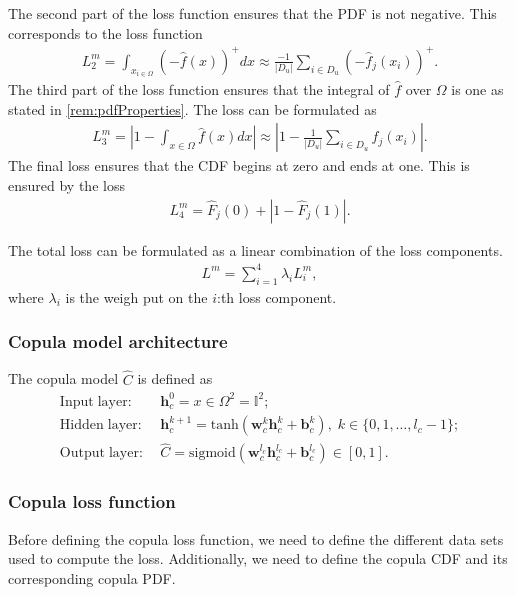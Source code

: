 The second part of the loss function ensures that the \gls{PDF} is not negative. This corresponds to the loss function 
\begin{align*}
    L_2^m = \int_{x_{i\in\Omega}} (-\hat{f}(x))^+dx \approx \frac{-1}{|D_{u}|} \sum_{i \in D_{u}} (-\hat{f}_j(x_i))^+.
\end{align*}
The third part of the loss function ensures that the integral of $\hat{f}$ over $\Omega$ is one as stated in \cref{rem:pdfProperties}. The loss can be formulated as 
\begin{align*}
    L_3^m = \left | 1- \int_{x\in \Omega} \hat{f}(x) dx    \right | \approx \left | 1- \frac{1}{|D_{u}|} \sum_{i \in D_{u}} \hat{f}_j(x_i)  \right |.
\end{align*}
The final loss ensures that the \gls{CDF} begins at zero and ends at one. This is ensured by the loss
\begin{align*}
    L_4^m = \hat{F}_j(0) + |1- \hat{F}_j(1) |.
\end{align*}

The total loss can be formulated as a linear combination of the loss components. 
\begin{align*}
    L^m = \sum_{i=1}^4 \lambda_i L_i^m,
\end{align*}
where $\lambda_i$ is the weigh put on the $i$:th loss component. 

\subsubsection{Copula model architecture} \citet[pp.~9--11]{ZengWang2022}
The copula model $\hat{C}$ is defined as 
\begin{align*}
    \mathrm{Input\;layer:} \; & \mathbf{h}_c^0 = x \in \Omega^2 = \mathbb{I}^2; \\
    \mathrm{Hidden\;layer:} \; & \mathbf{h}_c^{k+1} = \mathrm{tanh}(\mathbf{w}_c^{k} \mathbf{h}_c^{k} + \mathbf{b}_c^{k}), \; k \in \{0,1, \dots, l_c -1 \};\\
    \mathrm{Output\;layer:} \; & \hat{C} = \mathrm{sigmoid}(\mathbf{w}_c^{l_c} \mathbf{h}_c^{l_c} + \mathbf{b}_c^{l_c}) \in \left[0,1 \right].
\end{align*}

\subsubsection{Copula loss function}
Before defining the copula loss function, we need to define the different data sets used to compute the loss. Additionally, we need to define the copula \gls{CDF} and its corresponding copula \gls{PDF}. 

